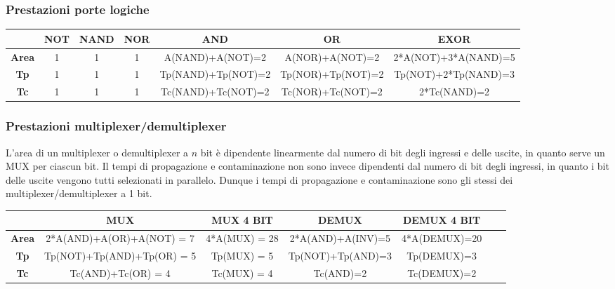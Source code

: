 \documentclass[10pt]{article}
\begin{document}
\begin{itemize}
\subsubsection{Prestazioni porte logiche}
\begin{table}[H]
    \begin{minipage}[c]{\textwidth}
    \centering
    \begin{tabular}{|c|c|c|c|c|c|c|}
    \hline
                  & \small{\textbf{NOT}} & \textbf{NAND} & \textbf{NOR} & \textbf{AND}       & \textbf{OR}       & \textbf{EXOR}         \\ \hline
    \textbf{Area} & 1                    & 1             & 1            & A(NAND)+A(NOT)=2   & A(NOR)+A(NOT)=2   & 2*A(NOT)+3*A(NAND)=5  \\ 
    \textbf{Tp}   & 1                    & 1             & 1            & Tp(NAND)+Tp(NOT)=2 & Tp(NOR)+Tp(NOT)=2 & Tp(NOT)+2*Tp(NAND)=3  \\ 
    \textbf{Tc}   & 1                    & 1             & 1            & Tc(NAND)+Tc(NOT)=2 & Tc(NOR)+Tc(NOT)=2 & 2*Tc(NAND)=2          \\ \hline
    \end{tabular}
\end{minipage}
\end{table}

\subsubsection{Prestazioni multiplexer/demultiplexer}
L'area di un multiplexer o demultiplexer a $n$ bit è dipendente linearmente dal numero di bit degli ingressi e delle uscite, in quanto serve un MUX per ciascun bit.
Il tempi di propagazione e contaminazione non sono invece dipendenti dal numero di bit degli ingressi, in quanto i bit delle uscite vengono tutti selezionati in parallelo. Dunque i tempi
di propagazione e contaminazione sono gli stessi dei multiplexer/demultiplexer a 1 bit.

\begin{table}[H]
    \begin{minipage}[c]{\textwidth}
    \centering
        \begin{tabular}{|c|c|c|c|c|c|c|}
        \hline
                      & \textbf{MUX}               & \textbf{MUX 4 BIT} & \textbf{DEMUX}     & \textbf{DEMUX 4 BIT} \\ \hline
        \textbf{Area} & 2*A(AND)+A(OR)+A(NOT) = 7  & 4*A(MUX) = 28      & 2*A(AND)+A(INV)=5  & 4*A(DEMUX)=20        \\ 
        \textbf{Tp}   & Tp(NOT)+Tp(AND)+Tp(OR) = 5 & Tp(MUX) = 5        & Tp(NOT)+Tp(AND)=3  & Tp(DEMUX)=3          \\ 
        \textbf{Tc}   & Tc(AND)+Tc(OR) = 4         & Tc(MUX) = 4        & Tc(AND)=2          & Tc(DEMUX)=2          \\ \hline
        \end{tabular}
    \end{minipage}
\end{table}


\end{itemize}
\end{document}
